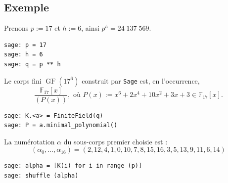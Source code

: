 \documentclass[a4paper, titlepage]{article}
\theoremstyle{definition}
\theoremstyle{remark}
\def\F{\mathbb F}
\def\gf{\operatorname{GF}}
\begin{document}
\subsection{Exemple}
Prenons $p := 17$ et $h := 6$, ainsi $p^h = 24\;137\;569$.
\begin{verbatim}
sage: p = 17
sage: h = 6
sage: q = p ** h
\end{verbatim}
Le corps fini $\gf(17^6)$ construit par \verb|Sage| est, en l’occurrence, 
$$\frac{\F_{17}[x]}{(P(x))}, \text{ où } P(x) := x^6 + 2x^4 + 10 x^2 +3x +3\in  \F_{17}[x].$$
\begin{verbatim}
sage: K.<a> = FiniteField(q)
sage: P = a.minimal_polynomial()
\end{verbatim}
La numérotation $\alpha$ du sous-corps premier choisie est :
$$(\alpha_0, \dots, \alpha_{16}) = (2, 12, 4, 1, 0, 10, 7, 8, 15, 16, 3, 5, 13, 9, 11, 6, 14)$$
\begin{verbatim}
sage: alpha = [K(i) for i in range (p)]
sage: shuffle (alpha)
\end{verbatim}
\end{document}
